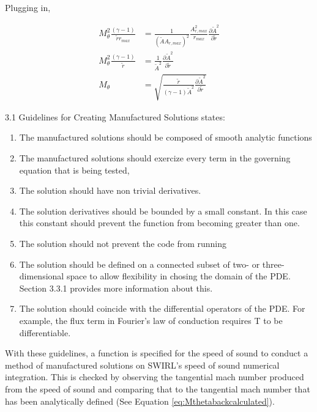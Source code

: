 Plugging in,

\begin{align} 
    M_{\theta}^2
    \frac{\left( \gamma - 1 \right)}{\widetilde{r} r_{max}} &=
    \frac{1}{(\widetilde{A}A_{r,max})^2}\frac{A_{r,max}^2}{r_{max}}
    \frac{\partial \widetilde{A}^2}{\partial \widetilde{r}} \nonumber \\
    M_{\theta}^2     \frac{\left( \gamma - 1 \right)}{\widetilde{r} } &=
    \frac{1}{\widetilde{A}^2}
    \frac{\partial \widetilde{A}^2}{\partial \widetilde{r}} \nonumber \\
    M_{\theta} &= \sqrt{\frac{\widetilde{r}}{(\gamma-1) \widetilde{A}^2}
        \frac{\partial\widetilde{A}^2}{\partial \widetilde{r} }
    } \label{eq:Mthetabackcalculated}
\end{align}

3.1 Guidelines for Creating Manufactured Solutions states:
\begin{enumerate}
    \item  The manufactured solutions should be composed of smooth analytic 
        functions 
    \item The manufactured solutions should exercize every term in the governing
        equation that is being tested,
    \item The solution should have non trivial derivatives.  
    \item The solution derivatives should be bounded by a small constant. In this case
        this constant should prevent the function from becoming greater than 
        one.
    \item The solution should not prevent the code from running 
    \item The solution should be defined on a connected subset of two- or three-
        dimensional space to allow flexibility in chosing the domain of the PDE.
        Section 3.3.1 provides more information about this.
    \item The solution should coincide with the differential operators of the PDE.
        For example, the flux term in Fourier's law of conduction requires T to 
        be differentiable.
\end{enumerate}
With these guidelines, a function is specified for the speed of sound to conduct
a method of manufactured solutions on SWIRL's speed of sound numerical 
integration. This is checked by observing the tangential mach number 
produced from the speed of sound and comparing that to the tangential mach number
that has been analytically defined (See Equation \ref{eq:Mthetabackcalculated}).
